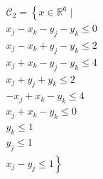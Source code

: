\documentclass[runningheads]{llncs}
\begin{document}
\begin{equation*}
\begin{aligned}
     &\mathcal{C}_{2}=\left\{x\in \mathbb{R}^{6}\mid \right. \\
                    &x_{j}-x_{k}-y_{j}-y_{k} \leq 0 \\
                    &x_{j}-x_{k}+y_{j}-y_{k} \leq 2 \\
                    &x_{j}+x_{k}-y_{j}-y_{k} \leq 4\\ 
                    &x_{j}+y_{j}+y_{k} \leq 2\\ 
                    &-x_{j}+x_{k}-y_{k} \leq 4\\ 
                    &x_{j}+x_{k}-y_{k} \leq 0\\ 
                    &y_{k} \leq 1\\ 
                    &y_{j} \leq 1\\ 
                    &x_{j}-y_{j} \leq 1\left.\right\}
	\end{aligned}
\end{equation*}
\end{document}
